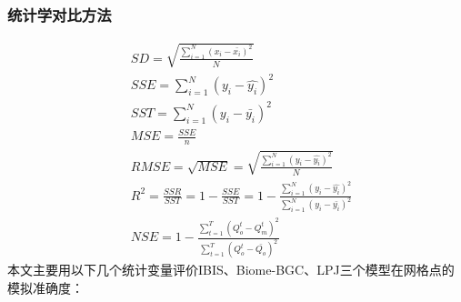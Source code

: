 \subsubsection{统计学对比方法}
\begin{align}
    &SD = \sqrt{\frac{\sum\limits_{i=1}^{N}\left(x_i-\bar{x_i}\right)^2}{N}}
    \label{eq:SD} \\
    &SSE = \sum\limits_{i=1}^{N}\left(y_i-\hat{y_i}\right)^2 \\
    &SST = \sum\limits_{i=1}^{N}\left(y_i-\bar{y_i}\right)^2 \\
    &MSE = \frac{SSE}{n} \\
    &RMSE = \sqrt{MSE} = \sqrt{\frac{\sum\limits_{i=1}^{N}\left(y_i-\hat{y_i}\right)^2}{N}}
    \label{eq:RMSE}  \\
    &R^2 = \frac{SSR}{SST} = 1 - \frac{SSE}{SST} = 1 - \frac{\sum\limits_{i=1}^{N}\left(y_i-\hat{y_i}\right)^2}{\sum\limits_{i=1}^{N}\left(y_i-\bar{y_i}\right)^2}
    \label{eq:R^2} \\
    &NSE = 1 - \frac{\sum\limits_{t=1}^{T}\left(Q_o^t - Q_m^t\right)^2}{\sum\limits_{t=1}^{T}\left(Q_o^t - \bar{Q_o}\right)^2}
    \label{eq:NSE}
\end{align}
本文主要用以下几个统计变量评价IBIS、Biome-BGC、LPJ三个模型在网格点的模拟准确度：
